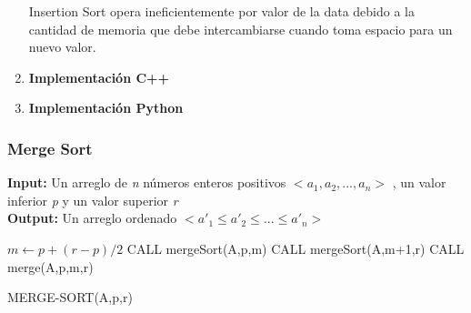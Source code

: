 \documentclass{article}
\begin{document}
\begin{enumerate}
                            Insertion Sort opera ineficientemente por valor de la data debido a la cantidad de memoria que debe intercambiarse cuando toma espacio para un nuevo valor.
                            
                            \item \textbf{Implementaci\'{o}n C++}
                    
                            
                            
                            \item \textbf{Implementaci\'{o}n Python}\\
                    
                            
                        
                    \end{enumerate}
		         
		         \subsubsection{Merge Sort}
		         
		            \begin{flushleft}
    		            \textbf{Input:} Un arreglo de \textit{n} números enteros positivos $<a_1,a_2,...,a_n>$ , un valor inferior \textit{p} y un valor superior \textit{r}  \\
    		            \textbf{Output:} Un arreglo ordenado $<a'_1 \leq a'_2 \leq ... \leq a'_n>$
		            \end{flushleft}
		            
		         
		            \begin{algorithm}[H]
                        \begin{algorithmic}[1]
                                    \STATE $m \gets p + (r-p)/2$ 
                                    \STATE CALL mergeSort(A,p,m)
                                    \STATE CALL mergeSort(A,m+1,r)
                                    \STATE CALL merge(A,p,m,r)
                                \ENDIF
                        \end{algorithmic}
                        \caption{MERGE-SORT(A,p,r)}
                        \label{alg:merge-sort}
                    \end{algorithm}
                    
\end{document}
